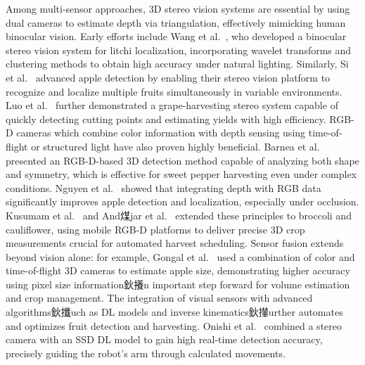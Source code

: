 \documentclass[a4paper,fleqn]{cas-dc}
\begin{document}
Among multi-sensor approaches, 3D stereo vision systems are essential by using dual cameras to estimate depth via triangulation, effectively mimicking human binocular vision. Early efforts include Wang et al.~\cite{wang2016localisation}, who developed a binocular stereo vision system for litchi localization, incorporating wavelet transforms and clustering methods to obtain high accuracy under natural lighting. Similarly, Si et al.~\cite{si2015location} advanced apple detection by enabling their stereo vision platform to recognize and localize multiple fruits simultaneously in variable environments. Luo et al.~\cite{luo2016vision} further demonstrated a grape-harvesting stereo system capable of quickly detecting cutting points and estimating yields with high efficiency.
RGB-D cameras which combine color information with depth sensing using time-of-flight or structured light have also proven highly beneficial. Barnea et al.~\cite{barnea2016colour} presented an RGB-D-based 3D detection method capable of analyzing both shape and symmetry, which is effective for sweet pepper harvesting even under complex conditions. Nguyen et al.~\cite{nguyen2016detection} showed that integrating depth with RGB data significantly improves apple detection and localization, especially under occlusion. Kusumam et al.~\cite{kusumam20173d} and And煤jar et al.~\cite{andujar2016using} extended these principles to broccoli and cauliflower, using mobile RGB-D platforms to deliver precise 3D crop measurements crucial for automated harvest scheduling.
Sensor fusion extends beyond vision alone: for example, Gongal et al.~\cite{gongal2018apple} used a combination of color and time-of-flight 3D cameras to estimate apple size, demonstrating higher accuracy using pixel size information鈥攁n important step forward for volume estimation and crop management.
The integration of visual sensors with advanced algorithms鈥攕uch as DL models and inverse kinematics鈥攆urther automates and optimizes fruit detection and harvesting. Onishi et al.~\cite{onishi2019automated} combined a stereo camera with an SSD DL model to gain high real-time detection accuracy, precisely guiding the robot's arm through calculated movements.
\end{document}
